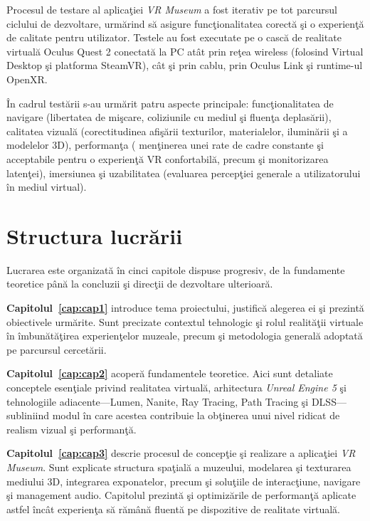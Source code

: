 Procesul de testare al aplicaţiei \emph{VR Museum} a fost iterativ pe tot parcursul ciclului de dezvoltare, urmărind să asigure funcţionalitatea corectă şi o experienţă de calitate pentru utilizator. Testele au fost executate pe o cască de realitate virtuală Oculus Quest 2 conectată la PC atât prin reţea wireless (folosind Virtual Desktop şi platforma SteamVR), cât şi prin cablu, prin Oculus Link şi runtime-ul OpenXR.

În cadrul testării s-au urmărit patru aspecte principale: funcţionalitatea de navigare (libertatea de mişcare, coliziunile cu mediul şi fluenţa deplasării), calitatea vizuală (corectitudinea afişării texturilor, materialelor, iluminării şi a modelelor 3D), performanţa ( menţinerea unei rate de cadre constante şi acceptabile pentru o experienţă VR confortabilă, precum şi monitorizarea latenţei),  imersiunea şi uzabilitatea (evaluarea percepţiei generale a utilizatorului în mediul virtual).




\section{Structura lucrării}

Lucrarea este organizată în cinci capitole dispuse progresiv, de la fundamente teoretice până la concluzii şi direcţii de dezvoltare ulterioară.

\smallskip
\noindent\textbf{Capitolul~\ref{cap:cap1}} introduce tema proiectului, justifică alegerea ei şi prezintă obiectivele urmărite. Sunt precizate contextul tehnologic şi rolul realităţii virtuale în îmbunătăţirea experienţelor muzeale, precum şi metodologia generală adoptată pe parcursul cercetării.

\smallskip
\noindent\textbf{Capitolul~\ref{cap:cap2}} acoperă fundamentele teoretice. Aici sunt detaliate conceptele esenţiale privind realitatea virtuală, arhitectura \textit{Unreal Engine 5} şi tehnologiile adiacente—Lumen, Nanite, Ray Tracing, Path Tracing şi DLSS—subliniind modul în care acestea contribuie la obţinerea unui nivel ridicat de realism vizual şi performanţă.

\smallskip
\noindent\textbf{Capitolul~\ref{cap:cap3}} descrie procesul de concepţie şi realizare a aplicaţiei \emph{VR Museum}. Sunt explicate structura spaţială a muzeului, modelarea şi texturarea mediului 3D, integrarea exponatelor, precum şi soluţiile de interacţiune, navigare şi management audio. Capitolul prezintă şi optimizările de performanţă aplicate astfel încât experienţa să rămână fluentă pe dispozitive de realitate virtuală.

